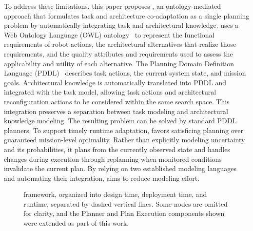 To address these limitations, this paper proposes \planta, an ontology-mediated approach that formulates task and architecture co-adaptation as a single planning problem by automatically integrating task and architectural knowledge. \planta uses a Web Ontology Language (OWL) ontology~\cite{aguado2024survey} to represent the functional requirements of robot actions, the architectural alternatives that realize those requirements, and the quality attributes and requirements used to assess the applicability and utility of each alternative. The Planning Domain Definition Language (PDDL)~\cite{karpas2020automated} describes task actions, the current system state, and mission goals. %
Architectural knowledge is automatically translated into PDDL and integrated with the task model, allowing task actions and architectural reconfiguration actions to be considered within the same search space. This integration preserves a separation between task modeling and architectural knowledge modeling. The resulting problem can be solved by standard PDDL planners. To support timely runtime adaptation, \planta favors satisficing planning over guaranteed mission-level optimality. Rather than explicitly modeling uncertainty and its probabilities, it plans from the currently observed state and handles changes during execution through replanning when monitored conditions invalidate the current plan. By relying on two established modeling languages and automating their integration, \planta aims to reduce modeling effort.

\begin{figure}[tbp]
	\centering
        \resizebox{\textwidth}{!}{
            
        }
		\caption{\planta framework, organized into design time, deployment time, and runtime, separated by dashed vertical lines. Some \plansys nodes are omitted for clarity, and the Planner and Plan Execution components shown were extended as part of this work.}%
	\label{planta:fig:architecture}
\end{figure}

